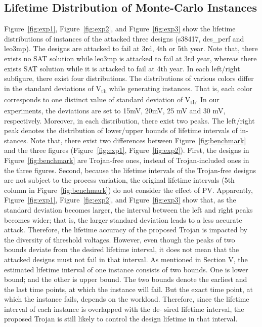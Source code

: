 \subsection{Lifetime Distribution of Monte-Carlo Instances}
Figure~\ref{fig:exp1}, Figure~\ref{fig:exp2}, and Figure~\ref{fig:exp3} show the lifetime distributions of instances of the attacked three designs (s38417, des\_perf and leo3mp). The designs are attacked to fail at 3rd, 4th or 5th year. Note that, there exists no SAT solution while leo3mp is attacked to fail at 3rd year, whereas there exists SAT solution while it is attacked to fail at 4th year. In each left/right subfigure, there exist four distributions. The distributions of various colors differ in the standard deviations of V\textsubscript{th} while generating instances. That is, each color corresponds to one distinct value of standard deviation of V\textsubscript{th}. In our experiments, the deviations are set to 15mV, 20mV, 25 mV and 30 mV, respectively. Moreover, in each distribution, there exist two peaks. The left/right peak denotes the distribution of lower/upper bounds of lifetime intervals of in- stances. Note that, there exist two differences between Figure~\ref{fig:benchmark} and the three figures (Figure~\ref{fig:exp1}, Figure~\ref{fig:exp2}). First, the designs in Figure~\ref{fig:benchmark} are Trojan-free ones, instead of Trojan-included ones in the three figures. Second, because the lifetime intervals of the Trojan-free designs are not subject to the process variation, the original lifetime intervals (5th column in Figure~\ref{fig:benchmark}) do not consider the effect of PV.
Apparently, Figure~\ref{fig:exp1}, Figure~\ref{fig:exp2}, and Figure~\ref{fig:exp3} show that, as the standard deviation becomes larger, the interval between the left and right peaks becomes wider; that is, the larger standard deviation leads to a less accurate attack. Therefore, the lifetime accuracy of the proposed Trojan is impacted by the diversity of threshold voltages. However, even though the peaks of two bounds deviate from the desired lifetime interval, it does not mean that the attacked designs must not fail in that interval. As mentioned in Section V, the estimated lifetime interval of one instance consists of two bounds. One is lower bound; and the other is upper bound. The two bounds denote the earliest and the last time points, at which the instance will fail. But the exact time point, at which the instance fails, depends on the workload. Therefore, since the lifetime interval of each instance is overlapped with the de- sired lifetime interval, the proposed Trojan is still likely to control the design lifetime in that interval.

